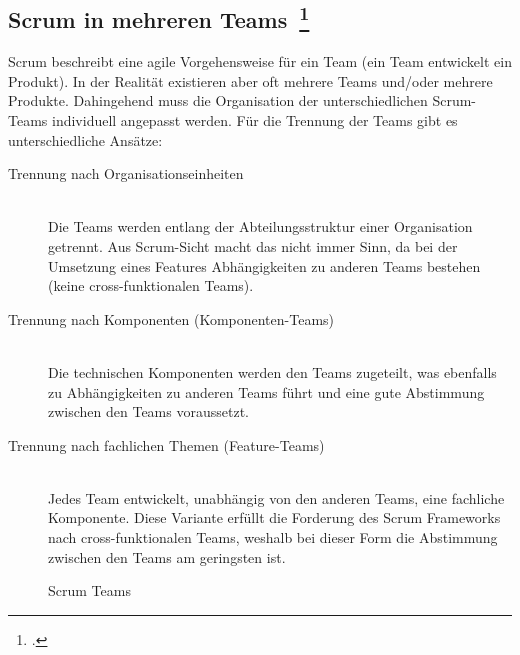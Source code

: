 \clearpage
\subsection[Scrum in mehreren Teams]{Scrum in mehreren Teams~\footcite[vgl.][S.172ff]{scrum_kurz_gut_2013}}

Scrum beschreibt eine agile Vorgehensweise für ein Team (ein Team entwickelt ein Produkt).
In der Realität existieren aber oft mehrere Teams und/oder mehrere Produkte. 
Dahingehend muss die Organisation der unterschiedlichen Scrum-Teams individuell angepasst werden.
Für die Trennung der Teams gibt es unterschiedliche Ansätze:
\begin{description}
  \item[Trennung nach Organisationseinheiten] \hfill \\ Die Teams werden entlang der Abteilungsstruktur einer Organisation getrennt. Aus Scrum-Sicht macht das nicht immer Sinn, da bei der Umsetzung eines Features Abhängigkeiten zu anderen Teams bestehen (keine cross-funktionalen Teams).
  \item[Trennung nach Komponenten (Komponenten-Teams)] \hfill \\ Die technischen Komponenten werden den Teams zugeteilt, was ebenfalls zu Abhängigkeiten zu anderen Teams führt und eine gute Abstimmung zwischen den Teams voraussetzt.
  \item[Trennung nach fachlichen Themen (Feature-Teams)] \hfill \\ Jedes Team entwickelt, unabhängig von den anderen Teams, eine fachliche Komponente. Diese Variante erfüllt die Forderung des Scrum Frameworks nach cross-funktionalen Teams, weshalb bei dieser Form die Abstimmung zwischen den Teams am geringsten ist.
\end{description}

\begin{savenotes}
  \begin{figure}[H]
    \centering
  \caption{Scrum Teams}\label{fig:Scrum Teams}
  \end{figure}
\end{savenotes}

